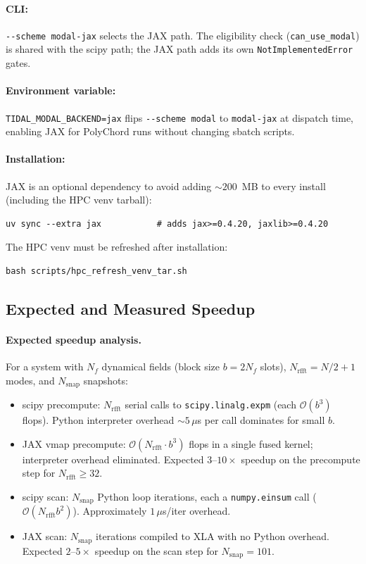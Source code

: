\paragraph{CLI:} \verb|--scheme modal-jax| selects the JAX path.  The
eligibility check (\texttt{can\_use\_modal}) is shared with the scipy path;
the JAX path adds its own \texttt{NotImplementedError} gates.

\paragraph{Environment variable:} \verb|TIDAL_MODAL_BACKEND=jax| flips
\verb|--scheme modal| to \verb|modal-jax| at dispatch time, enabling
JAX for PolyChord runs without changing sbatch scripts.

\paragraph{Installation:} JAX is an optional dependency to avoid adding
$\sim200$~MB to every install (including the HPC venv tarball):
\begin{verbatim}
uv sync --extra jax           # adds jax>=0.4.20, jaxlib>=0.4.20
\end{verbatim}
The HPC venv must be refreshed after installation:
\begin{verbatim}
bash scripts/hpc_refresh_venv_tar.sh
\end{verbatim}

\subsection{Expected and Measured Speedup}
\label{sec:modal_jax_speedup}

\paragraph{Expected speedup analysis.}
For a system with $N_f$ dynamical fields (block size $b = 2N_f$ slots),
$N_{\mathrm{rfft}} = N/2+1$ modes, and $N_{\mathrm{snap}}$ snapshots:

\begin{itemize}
  \item scipy precompute: $N_{\mathrm{rfft}}$ serial calls to
    \texttt{scipy.linalg.expm} (each $\mathcal{O}(b^3)$ flops).
    Python interpreter overhead $\sim5\,\mu$s per call dominates for
    small $b$.
  \item JAX vmap precompute: $\mathcal{O}(N_{\mathrm{rfft}} \cdot b^3)$
    flops in a single fused kernel; interpreter overhead eliminated.
    Expected $3$--$10\times$ speedup on the precompute step for
    $N_{\mathrm{rfft}} \geq 32$.
  \item scipy scan: $N_{\mathrm{snap}}$ Python loop iterations, each a
    \texttt{numpy.einsum} call ($\mathcal{O}(N_{\mathrm{rfft}} b^2)$).
    Approximately $1\,\mu$s/iter overhead.
  \item JAX scan: $N_{\mathrm{snap}}$ iterations compiled to XLA with
    no Python overhead.  Expected $2$--$5\times$ speedup on the scan step
    for $N_{\mathrm{snap}} = 101$.
\end{itemize}

